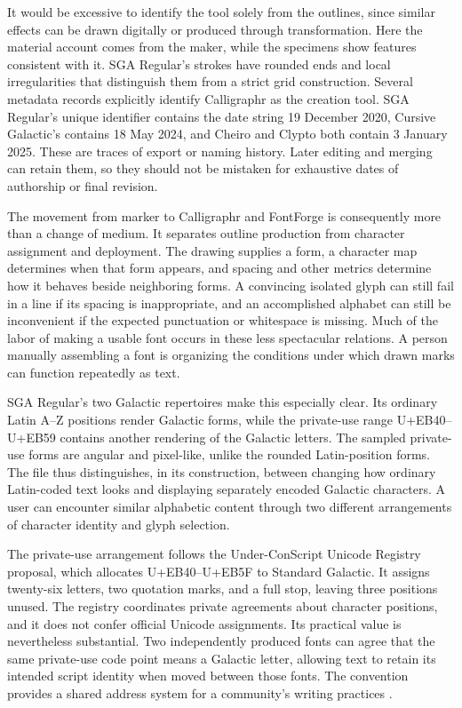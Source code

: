 \documentclass[11pt]{article}
\begin{document}
It would be excessive to identify the tool solely from the outlines, since similar effects can be drawn digitally or produced through transformation. Here the material account comes from the maker, while the specimens show features consistent with it. SGA Regular's strokes have rounded ends and local irregularities that distinguish them from a strict grid construction. Several metadata records explicitly identify Calligraphr as the creation tool. SGA Regular's unique identifier contains the date string 19 December 2020, Cursive Galactic's contains 18 May 2024, and Cheiro and Clypto both contain 3 January 2025. These are traces of export or naming history. Later editing and merging can retain them, so they should not be mistaken for exhaustive dates of authorship or final revision.

The movement from marker to Calligraphr and FontForge is consequently more than a change of medium. It separates outline production from character assignment and deployment. The drawing supplies a form, a character map determines when that form appears, and spacing and other metrics determine how it behaves beside neighboring forms. A convincing isolated glyph can still fail in a line if its spacing is inappropriate, and an accomplished alphabet can still be inconvenient if the expected punctuation or whitespace is missing. Much of the labor of making a usable font occurs in these less spectacular relations. A person manually assembling a font is organizing the conditions under which drawn marks can function repeatedly as text.

SGA Regular's two Galactic repertoires make this especially clear. Its ordinary Latin A--Z positions render Galactic forms, while the private-use range U+EB40--U+EB59 contains another rendering of the Galactic letters. The sampled private-use forms are angular and pixel-like, unlike the rounded Latin-position forms. The file thus distinguishes, in its construction, between changing how ordinary Latin-coded text looks and displaying separately encoded Galactic characters. A user can encounter similar alphabetic content through two different arrangements of character identity and glyph selection.

The private-use arrangement follows the Under-ConScript Unicode Registry proposal, which allocates U+EB40--U+EB5F to Standard Galactic. It assigns twenty-six letters, two quotation marks, and a full stop, leaving three positions unused. The registry coordinates private agreements about character positions, and it does not confer official Unicode assignments. Its practical value is nevertheless substantial. Two independently produced fonts can agree that the same private-use code point means a Galactic letter, allowing text to retain its intended script identity when moved between those fonts. The convention provides a shared address system for a community's writing practices \cite{ucsur-sga,ucsur}.
\end{document}
